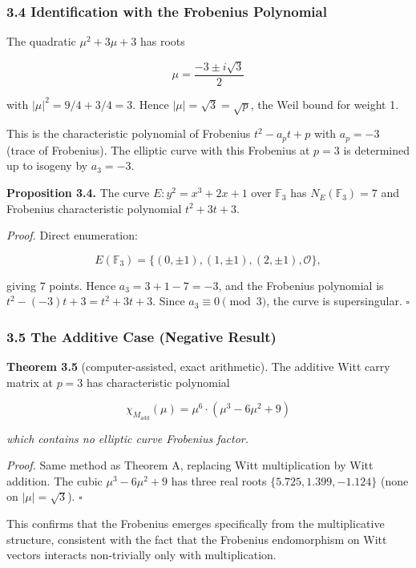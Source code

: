 \documentclass[
  11pt,
]{article}
\begin{document}
\subsubsection{3.4 Identification with the Frobenius
Polynomial}\label{identification-with-the-frobenius-polynomial}

The quadratic \(\mu^2 + 3\mu + 3\) has roots

\[\mu = \frac{-3 \pm i\sqrt{3}}{2}\]

with \(\lvert\mu\rvert^2 = 9/4 + 3/4 = 3\). Hence
\(\lvert\mu\rvert = \sqrt{3} = \sqrt{p}\), the Weil bound for weight 1.

This is the characteristic polynomial of Frobenius \(t^2 - a_p t + p\) with
\(a_p = -3\) (trace of Frobenius). The elliptic curve with this Frobenius at
\(p = 3\) is determined up to isogeny by \(a_3 = -3\).

\textbf{Proposition 3.4.} The curve \(E: y^2 = x^3 + 2x + 1\) over
\(\mathbb{F}_3\) has \(N_E(\mathbb{F}_3) = 7\) and Frobenius characteristic
polynomial \(t^2 + 3t + 3\).

\emph{Proof.} Direct enumeration:

\[E(\mathbb{F}_3) = \lbrace{}(0, \pm 1), (1, \pm 1), (2, \pm 1), \mathcal{O}\rbrace{},\]

giving \(7\) points. Hence \(a_3 = 3 + 1 - 7 = -3\), and the Frobenius
polynomial is \(t^2 - (-3)t + 3 = t^2 + 3t + 3\). Since
\(a_3 \equiv 0 \pmod{3}\), the curve is supersingular. \(\square\)

\subsubsection{3.5 The Additive Case (Negative
Result)}\label{the-additive-case-negative-result}

\textbf{Theorem 3.5} (computer-assisted, exact arithmetic). The additive Witt
carry matrix at \(p = 3\) has characteristic polynomial

\[\chi_{M_{\text{add}}}(\mu) = \mu^6 \cdot (\mu^3 - 6\mu^2 + 9)\]

\emph{which contains no elliptic curve Frobenius factor.}

\emph{Proof.} Same method as Theorem A, replacing Witt multiplication by Witt
addition. The cubic \(\mu^3 - 6\mu^2 + 9\) has three real roots
\(\lbrace{}5.725, 1.399, -1.124\rbrace{}\) (none on
\(\lvert\mu\rvert = \sqrt{3}\)). \(\square\)

This confirms that the Frobenius emerges specifically from the multiplicative
structure, consistent with the fact that the Frobenius endomorphism on Witt
vectors interacts non-trivially only with multiplication.
\end{document}
